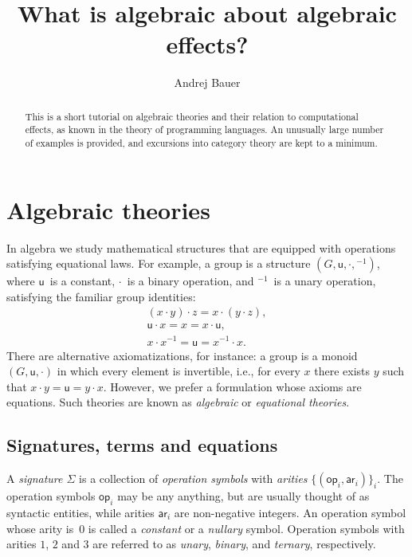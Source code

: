 \documentclass{amsart}
\newcommand{\family}[2]{\{#1\}_{#2}} %
\newcommand{\op}[1]{\mathsf{op}_{#1}} %
\newcommand{\arity}[1]{\mathsf{ar}_{#1}} %
\begin{document}
\title{What is algebraic about algebraic effects?}

\author{Andrej Bauer}

\begin{abstract}
  This is a short tutorial on algebraic theories and their relation to computational
  effects, as known in the theory of programming languages. An unusually large number of
  examples is provided, and excursions into category theory are kept to a minimum.
\end{abstract}

\maketitle

\section{Algebraic theories}
\label{sec:algebraic-theories}


In algebra we study mathematical structures that are equipped with operations satisfying
equational laws. For example, a group is a structure $(G, \mathsf{u}, {\cdot}, {}^{-1})$,
where $\mathsf{u}$~is a constant, $\cdot$~is a binary operation, and ${}^{-1}$~is a unary
operation, satisfying the familiar group identities:
%
\begin{gather*}
  (x \cdot y) \cdot z = x \cdot (y \cdot z),\\
  \mathsf{u} \cdot x = x = x \cdot \mathsf{u},\\
  x \cdot x^{-1} = \mathsf{u} = x^{-1} \cdot x.
\end{gather*}
%
There are alternative axiomatizations, for instance: a group is a monoid
$(G, \mathsf{u}, {\cdot})$ in which every element is invertible, i.e., for every $x$ there
exists $y$ such that $x \cdot y = \mathsf{u} = y \cdot x$. However, we prefer a
formulation whose axioms are equations. Such theories are known as
\emph{algebraic} or \emph{equational theories}.

\subsection{Signatures, terms and equations}
\label{sec:signatures-equations}

A \emph{signature $\Sigma$} is a collection of \emph{operation symbols} with
\emph{arities} $\family{(\op{i}, \arity{i})}{i}$. The operation symbols
$\op{i}$ may be any anything, but are usually thought of as syntactic entities,
while arities $\arity{i}$ are non-negative integers. An operation symbol whose
arity is~$0$ is called a \emph{constant} or a \emph{nullary} symbol. Operation
symbols with arities $1$, $2$ and $3$ are referred to as \emph{unary},
\emph{binary}, and \emph{ternary}, respectively.
\end{document}
